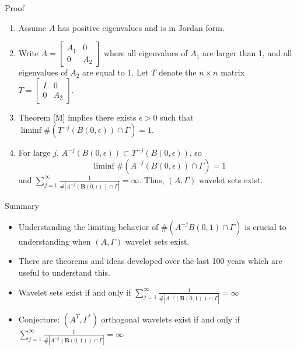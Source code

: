 \documentclass{sintefbeamer}
\begin{document}
\begin{frame}{Proof}
\begin{enumerate}
    \item Assume $A$ has positive eigenvalues and is in Jordan form.
\pause
      \item Write $A = \begin{bmatrix}
  A_1&0\\
  0&A_2
  \end{bmatrix}$
  where all eigenvalues of $A_1$ are larger than 1, and all eigenvalues of $A_2$ are equal to 1. Let $T$ denote the $n \times n$ matrix $T = \begin{bmatrix}
  I&0\\
  0&A_2
  \end{bmatrix}.$

\pause \item Theorem [M] implies there exists $\epsilon > 0$ such that $\liminf \# \left(T^{-j}(B(0, \epsilon)) \cap \Gamma\right) = 1$.
  \pause \item For large $j$, $A^{-j}(B(0, \epsilon)) \subset T^{-j}(B(0, \epsilon))$, so 
  $$
\liminf  \#(A^{-j}(B(0, \epsilon)) \cap \Gamma) = 1 
  $$
and $\sum_{j=1}^\infty \frac{1}{\# \left|A^{-j}(\mathbf B(0,\epsilon)) \cap \Gamma \right |} =\infty.$ Thus, $(A, \Gamma)$ wavelet sets exist.
\end{enumerate}
  
  
\end{frame}

\begin{frame}{Summary}

\begin{itemize}
\item Understanding the limiting behavior of $\#\left(A^{-j}B(0, 1) \cap \Gamma\right)$ is crucial to understanding when $(A, \Gamma)$ wavelet sets exist.
\pause \item There are theorems and ideas developed over the last 100 years which are useful to understand this.
\pause \item Wavelet sets exist if and only if $\sum_{j=1}^\infty \frac{1}{\# \left|A^{-j}(\mathbf B(0,1)) \cap \Gamma \right |} =\infty$
\pause \item Conjecture: $(A^T, \Gamma^*)$ orthogonal wavelets exist if and only if $\sum_{j=1}^\infty \frac{1}{\# \left|A^{-j}(\mathbf B(0,1)) \cap \Gamma \right |} =\infty$
\end{itemize}

\end{frame}
\end{document}
